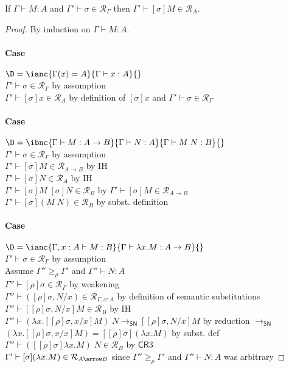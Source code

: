 \documentclass{article}
\newcommand{\ext}[1]{\geq_{#1}}
\newcommand{\SN}{\mathsf{SN}}
\newcommand{\CR}{\textsf{CR}}
\newcommand{\denot}[1]{\mathcal{R}_{#1}}
\newcommand{\inden}[3]{#1 \vdash #2 \in \denot{#3}}
\newcommand{\redSN}{\longrightarrow_\SN}
\begin{document}
\begin{lemma}
If $\Gamma \vdash M : A$ and $\inden{\Gamma'}{\sigma}{\Gamma}$
then $\inden{\Gamma'}{[\sigma]M}{A}$.
\end{lemma}
\begin{proof}
By induction on $\Gamma \vdash M : A$.

\paragraph{Case} $\D = \ianc{\Gamma(x) = A}{\Gamma \vdash x : A}{}$
\\[1em]
$\inden{\Gamma'}{\sigma}{\Gamma}$ \hfill by assumption \\
$\inden{\Gamma'}{[\sigma]x}{A}$ \hfill by definition of $[\sigma]x$ and $\inden{\Gamma'}{\sigma}{\Gamma}$

\paragraph{Case} $\D = \ibnc{\Gamma \vdash M : A \rightarrow B}{\Gamma \vdash N : A}{\Gamma \vdash M\;N : B}{}$
\\
$\inden{\Gamma'}{\sigma}{\Gamma}$ \hfill by assumption \\
$\inden{\Gamma'}{[\sigma]M}{A \rightarrow B}$ \hfill by IH\\
$\inden{\Gamma'}{[\sigma]N}{A}$ \hfill by IH\\
$\inden{\Gamma'}{[\sigma]M\;[\sigma]N}{B}$ \hfill by $\inden{\Gamma'}{[\sigma]M}{A \rightarrow B}$\\
$\inden{\Gamma'}{[\sigma](M\;N)}{B}$ \hfill by subst. definition \\


\paragraph{Case} $\D = \ianc{\Gamma, x:A \vdash M:B}{\Gamma \vdash \lambda x.M : A \rightarrow B}{}$
\\
$\inden{\Gamma'}{\sigma}{\Gamma}$ \hfill by assumption \\
Assume $\Gamma'' \ext{\rho} \Gamma'$ and $\Gamma'' \vdash N : A$  \\
$\inden{\Gamma''}{[\rho] \sigma}{\Gamma}$ \hfill by weakening \\
$\inden{\Gamma''}{([\rho]\sigma, N/x)}{\Gamma, x:A}$ \hfill by definition of semantic substitutions\\
$\inden{\Gamma''}{[[\rho]\sigma, N/x]M}{B}$ \hfill by IH \\
$\Gamma'' \vdash (\lambda x.[[\rho]\sigma,x/x]M)\;N \redSN [[\rho]\sigma, N/x]M$ \hfill by reduction $\redSN$ \\
$(\lambda x.[[\rho]\sigma,x/x]M) = [[\rho]\sigma](\lambda x.M)$ \hfill by subst. def\\
$\inden{\Gamma''}{([[\rho]\sigma]\lambda x.M)\;N}{B}$ \hfill by $\CR 3$ \\
$\inden{\Gamma'}{[\sigma](\lambda x.M)}{A \arrow B}$ \hfill since $\Gamma'' \ext{\rho} \Gamma'$ and $\Gamma'' \vdash N : A$  was arbitrary

\end{proof}
\end{document}
